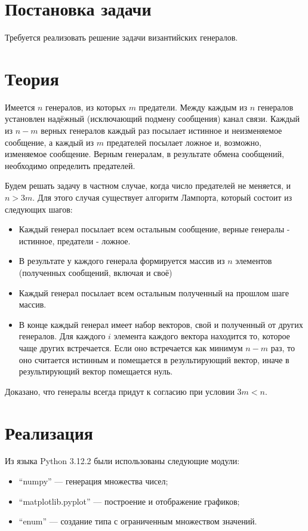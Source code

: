 \documentclass[a4paper,12pt]{article}
\begin{document}

\newpage

\tableofcontents
\listoffigures
\listoftables
\newpage

\section{Постановка задачи}
\quad Требуется реализовать решение задачи византийских генералов.

\section{Теория}
\quad Имеется $ n $ генералов, из которых $ m $ предатели. Между каждым из $ n $
генералов установлен надёжный (исключающий подмену сообщения) канал связи.
Каждый из $ n - m $ верных генералов каждый раз посылает истинное и неизменяемое
сообщение, а каждый из $ m $ предателей посылает ложное и, возможно, изменяемое
сообщение. Верным генералам, в результате обмена сообщений, необходимо
определить предателей.

\quad Будем решать задачу в частном случае, когда число предателей не меняется, и $ n
> 3m $. Для этого случая существует алгоритм Лампорта, который состоит из
следующих шагов:

\begin{itemize}
  \item Каждый генерал посылает всем остальным сообщение, верные генералы -
    истинное, предатели - ложное.
  \item В результате у каждого генерала формируется массив из $ n $ элементов
    (полученных сообщений, включая и своё)
  \item Каждый генерал посылает всем остальным полученный на прошлом шаге
    массив.
  \item В конце каждый генерал имеет набор векторов, свой и полученный от других
    генералов. Для каждого $ i $ элемента каждого вектора находится то, которое
    чаще других встречается. Если оно встречается как минимум $ n - m $ раз, то
    оно считается истинным и помещается в результирующий вектор, иначе в
    результирующий вектор помещается нуль.
\end{itemize}

\quad Доказано, что генералы всегда придут к согласию при условии $ 3m < n $.

\section{Реализация}
\quad Из языка Python 3.12.2 были использованы следующие модули:
\begin{itemize}
  \item ``numpy'' --- генерация множества чисел;
  \item ``matplotlib.pyplot'' --- построение и отображение графиков;
  \item ``enum'' --- создание типа с ограниченным множеством значений.
\end{itemize}
\end{document}
